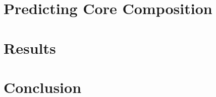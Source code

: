 \section{Predicting Core Composition}


%

\section{Results}
\label{sec:results}


%

\section{Conclusion}
\label{sec:conclusion}


%

%
%
%




